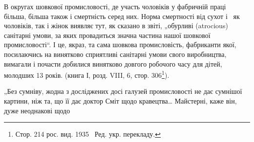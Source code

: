 В округах шовкової промисловості, де участь чоловіків
у фабричній праці більша, більша також і смертність серед них.
Норма смертності від сухот і~ як чоловіків, так і жінок
виявляє тут, як сказано в звіті, „обурливі (atrocious) санітарні
умови, за яких провадиться значна частина нашої шовкової
промисловості“. І це, якраз, та сама шовкова промисловість,
фабриканти якої, посилаючись на винятково сприятливі санітарні умови свого виробництва, вимагали і
почасти добилися
винятково довгого робочого часу для дітей, молодших 13 років.
(книга І, розд. VIII, 6, стор. 306\footnote*{Стор. 214 рос. вид. 1935~ Ред. укр. перекладу.}).

„Без сумніву, жодна з досліджених досі галузей промисловості
не дає сумнішої картини, ніж та, що її дає доктор Сміт
щодо кравецтва\dots{} Майстерні, каже він, дуже неоднакові щодо

\parbreak{}  %
